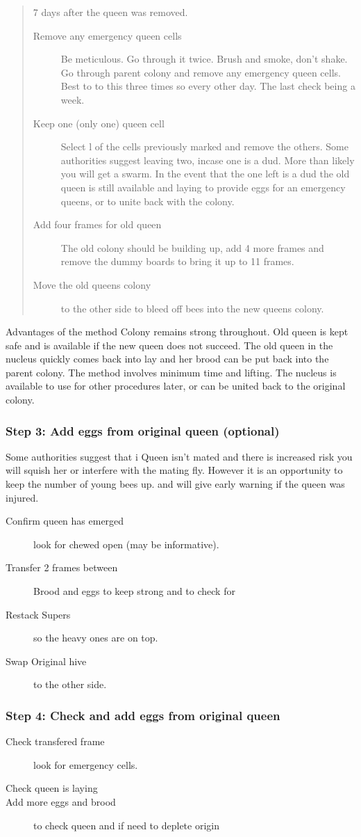 \begin{quotation}
7 days after the queen was removed.
\begin{description}
  \item[Remove any emergency queen cells] Be meticulous.  Go through it twice.  Brush and smoke, don't shake.
	Go through parent colony and remove any emergency queen cells.  Best to to this three times so every other day.  The last check being a week.
  \item[Keep one (only one) queen cell]
	Select l of the cells previously marked and remove the others.
	Some authorities suggest leaving two, incase one is a dud.
	More than likely you will get a swarm.
	In the event that the one left is a dud the old queen is still available and laying to provide eggs for an emergency queens,
	or to unite back with the colony.
  \item[Add four frames for old queen] The old colony should be building up, add 4 more frames and remove the dummy boards to bring it up to 11 frames.
  \item[Move the old queens colony] to the other side to bleed off bees into the new queens colony.
\end{description}
\end{quotation}

Advantages of the method
Colony remains strong throughout.
Old queen is kept safe and is available if the new queen does not succeed.
The old queen in the nucleus quickly comes back into lay and her brood can be put back into the parent colony.
The method involves minimum time and lifting.
The nucleus is available to use for other procedures later, or can be united back to the original colony.

\subsubsection*{Step 3: Add eggs from original queen (optional)}

Some authorities suggest that i
Queen isn't mated and there is increased risk you will squish her or interfere with the mating fly.
However it is an opportunity to keep the number of young bees up.
and will give early warning if the queen was injured.

\begin{description}
  \item[Confirm queen has emerged] look for chewed open (may be informative).
  \item[Transfer 2 frames between] Brood and eggs to keep strong and to check for
  \item[Restack Supers] so the heavy ones are on top.
  \item[Swap Original hive] to the other side.
\end{description}

\subsubsection*{Step 4: Check and add eggs from original queen}

\begin{description}
  \item[Check transfered frame] look for emergency cells.
  \item[Check queen is laying] 
  \item[Add more eggs and brood] to check queen and if need to deplete origin
\end{description}




